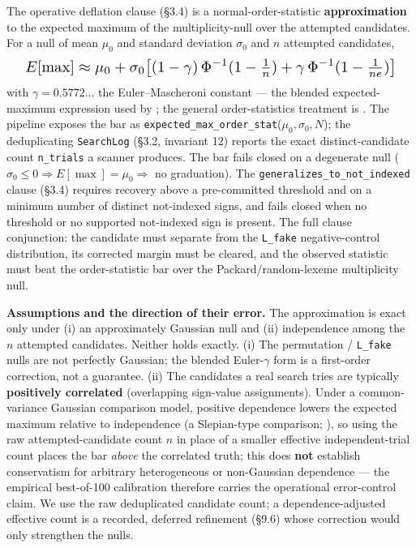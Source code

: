 The operative deflation clause (\S3.4) is a normal-order-statistic
\textbf{approximation} to the expected maximum of the multiplicity-null over
the attempted candidates. For a null of mean $\mu_0$ and standard deviation
$\sigma_0$ and $n$ attempted candidates,
\[
  \resizebox{0.95\columnwidth}{!}{$\displaystyle
  E[\max] \approx \mu_0 + \sigma_0\bigl[(1-\gamma)\,\Phi^{-1}(1-\tfrac{1}{n})
  + \gamma\,\Phi^{-1}(1-\tfrac{1}{ne})\bigr]$}
\]
with $\gamma = 0.5772\ldots$ the Euler--Mascheroni constant --- the
blended expected-maximum expression used by \citet{bailey2014}; the
general order-statistics treatment is \citet[\emph{Order Statistics}, 3rd
ed.]{david2003}. The
pipeline exposes the bar as
\texttt{expected\_max\_order\_stat}($\mu_0, \sigma_0, N$); the
deduplicating \texttt{SearchLog}
(\S3.2, invariant 12) reports the exact distinct-candidate count
\texttt{n\_trials} a scanner produces. The bar fails closed on a degenerate null
($\sigma_0 \le 0 \Rightarrow E[\max] = \mu_0 \Rightarrow$ no graduation).
The \texttt{generalizes\_to\_not\_indexed} clause (\S3.4) requires recovery
above a pre-committed threshold and on a minimum number of distinct
not-indexed signs, and fails closed when no threshold or no supported
not-indexed sign is present. The full clause conjunction: the candidate
must separate from the \texttt{L\_fake} negative-control distribution,
its corrected margin must be cleared, and the observed statistic must
beat the order-statistic bar over the Packard/random-lexeme multiplicity
null.

\textbf{Assumptions and the direction of their error.} The approximation is
exact only under (i) an approximately Gaussian null and (ii) independence
among the $n$ attempted candidates. Neither holds exactly. (i) The
permutation / \texttt{L\_fake} nulls are not perfectly Gaussian; the blended
Euler-$\gamma$ form is a first-order correction, not a guarantee. (ii) The
candidates a real search tries are typically \textbf{positively correlated}
(overlapping sign-value assignments). Under a common-variance Gaussian
comparison model, positive dependence lowers the expected maximum relative
to independence (a Slepian-type comparison; \citealp{slepian1962}), so
using the
raw attempted-candidate count $n$ in place of a smaller effective
independent-trial count places the bar \emph{above} the correlated truth;
this does \textbf{not} establish conservatism for arbitrary heterogeneous
or non-Gaussian dependence --- the empirical best-of-100 calibration
therefore carries the operational error-control claim. We use the
raw deduplicated candidate count; a dependence-adjusted effective count is a
recorded, deferred refinement (\S9.6) whose correction would only strengthen
the nulls.

